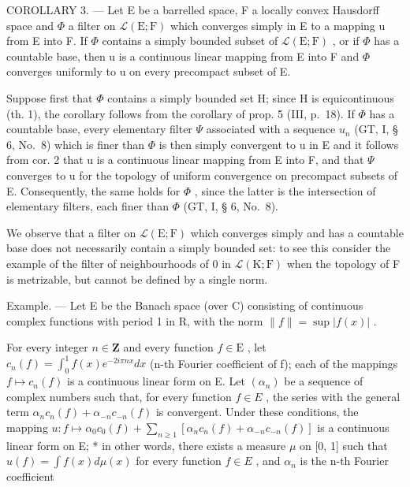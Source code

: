 COROLLARY 3. --- Let E be a barrelled space, F a locally convex Hausdorff space and \(\Phi\) a filter on \(\mathcal{L}(\mathrm{E};\mathrm{F})\) which converges simply in E to a mapping u from E into F. If \(\Phi\) contains a simply bounded subset of \(\mathcal{L}(\mathrm{E};\mathrm{F})\) , or if \(\Phi\) has a countable base, then u is a continuous linear mapping from E into F and \(\Phi\) converges uniformly to u on every precompact subset of E.

Suppose first that \(\Phi\) contains a simply bounded set H; since H is equicontinuous (th. 1), the corollary follows from the corollary of prop. 5 (III, p.~18). If \(\Phi\) has a countable base, every elementary filter \(\Psi\) associated with a sequence \(u_{n}\) (GT, I, § 6, No.~8) which is finer than \(\Phi\) is then simply convergent to u in E and it follows from cor. 2 that u is a continuous linear mapping from E into F, and that \(\Psi\) converges to u for the topology of uniform convergence on precompact subsets of E. Consequently, the same holds for \(\Phi\) , since the latter is the intersection of elementary filters, each finer than \(\Phi\) (GT, I, § 6, No.~8).

We observe that a filter on \(\mathcal{L}(\mathrm{E};\mathrm{F})\) which converges simply and has a countable base does not necessarily contain a simply bounded set: to see this consider the example of the filter of neighbourhoods of 0 in \(\mathcal{L}(\mathrm{K};\mathrm{F})\) when the topology of F is metrizable, but cannot be defined by a single norm.

Example. --- Let E be the Banach space (over C) consisting of continuous complex functions with period 1 in R, with the norm \(\|f\| = \sup |f(x)|\) .

For every integer \(n \in \mathbf{Z}\) and every function \(f \in \mathrm{E}\) , let \(c_{n}(f) = \int_{0}^{1} f(x)e^{-2i\pi nx} dx\) (n-th Fourier coefficient of f); each of the mappings \(f \mapsto c_{n}(f)\) is a continuous linear form on E. Let \((\alpha_{n})\) be a sequence of complex numbers such that, for every function \(f \in E\) , the series with the general term \(\alpha_{n}c_{n}(f) + \alpha_{-n}c_{-n}(f)\) is convergent. Under these conditions, the mapping \(u: f \mapsto \alpha_{0}c_{0}(f) + \sum_{n \geqslant 1} [\alpha_{n}c_{n}(f) + \alpha_{-n}c_{-n}(f)]\) is a continuous linear form on E; * in other words, there exists a measure \(\mu\) on {[}0, 1{]} such that \(u(f) = \int f(x) d\mu(x)\) for every function \(f \in E\) , and \(\alpha_{n}\) is the n-th Fourier coefficient

